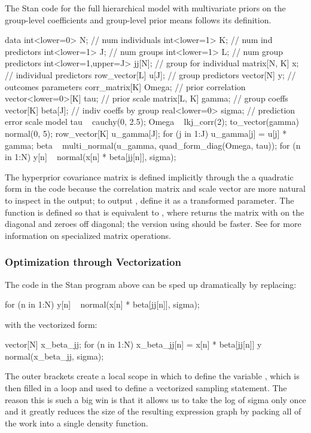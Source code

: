 The Stan code for the full hierarchical model with multivariate priors
on the group-level coefficients and group-level prior means follows
its definition.
%
\begin{stancode}
data {
  int<lower=0> N;              // num individuals
  int<lower=1> K;              // num ind predictors
  int<lower=1> J;              // num groups
  int<lower=1> L;              // num group predictors
  int<lower=1,upper=J> jj[N];  // group for individual
  matrix[N, K] x;               // individual predictors
  row_vector[L] u[J];          // group predictors
  vector[N] y;                 // outcomes
}
parameters {
  corr_matrix[K] Omega;        // prior correlation
  vector<lower=0>[K] tau;      // prior scale
  matrix[L, K] gamma;           // group coeffs
  vector[K] beta[J];           // indiv coeffs by group
  real<lower=0> sigma;         // prediction error scale
}
model {
  tau ~ cauchy(0, 2.5);
  Omega ~ lkj_corr(2);
  to_vector(gamma) ~ normal(0, 5);
  {
    row_vector[K] u_gamma[J];
    for (j in 1:J)
      u_gamma[j] = u[j] * gamma;
    beta ~ multi_normal(u_gamma, quad_form_diag(Omega, tau));
  }
  for (n in 1:N)
    y[n] ~ normal(x[n] * beta[jj[n]], sigma);
}
\end{stancode}
%
The hyperprior covariance matrix is defined implicitly through the
a quadratic form in the code 
because the correlation matrix  and scale vector
 are more natural to inspect in the output; to output
, define it as a transformed parameter.  The function
 is defined so that
 is equivalent to
, where
 returns the matrix with  on the
diagonal and zeroes off diagonal; the version using
 should be faster.  See
 for more information on
specialized matrix operations.

\subsubsection{Optimization through Vectorization}

The code in the Stan program above can be sped up dramatically by replacing:
%
\begin{stancode}
  for (n in 1:N)
    y[n] ~ normal(x[n] * beta[jj[n]], sigma);
\end{stancode}
%
with the vectorized form:
%
\begin{stancode}
  {
    vector[N] x_beta_jj;
    for (n in 1:N)
      x_beta_jj[n] = x[n] * beta[jj[n]]
    y ~ normal(x_beta_jj, sigma);
  }
\end{stancode}
%
The outer brackets create a local scope in which to define the
variable , which is then filled in a loop and used
to define a vectorized sampling statement.  The reason this is such a
big win is that it allows us to take the log of sigma only once and it
greatly reduces the size of the resulting expression graph by packing
all of the work into a single density function.


